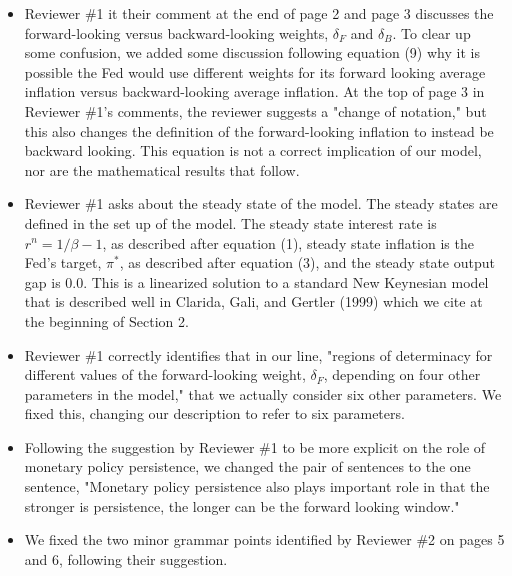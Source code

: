 \documentclass[english,authoryear,12pt]{elsarticle}
\begin{document}
\begin{itemize}
	\item Reviewer \#1 it their comment at the end of page 2 and page 3 discusses the forward-looking versus backward-looking weights, $\delta_F$ and $\delta_B$. To clear up some confusion, we added some discussion following equation (9) why it is possible the Fed would use different weights for its forward looking average inflation versus backward-looking average inflation. At the top of page 3 in Reviewer \#1's comments, the reviewer suggests a "change of notation," but this also changes the definition of the forward-looking inflation to instead be backward looking. This equation is not a correct implication of our model, nor are the mathematical results that follow.
	\item Reviewer \#1 asks about the steady state of the model. The steady states are defined in the set up of the model. The steady state interest rate is $r^n = 1/\beta - 1$, as described after equation (1), steady state inflation is the Fed's target, $\pi^*$, as described after equation (3), and the steady state output gap is 0.0. This is a linearized solution to a standard New Keynesian model that is described well in Clarida, Gali, and Gertler (1999) which we cite at the beginning of Section 2.
	\item Reviewer \#1 correctly identifies that in our line, "regions of determinacy for different values of the forward-looking weight, $\delta_F$, depending on four other parameters in the model," that we actually consider six other parameters. We fixed this, changing our description to refer to six parameters.
	\item Following the suggestion by Reviewer \#1 to be more explicit on the role of monetary policy persistence, we changed the pair of sentences to the one sentence, "Monetary policy persistence also plays important role in that the stronger is persistence, the longer can be the forward looking window."

	\item We fixed the two minor grammar points identified by Reviewer \#2 on pages 5 and 6, following their suggestion.
\end{itemize}
\end{document}

